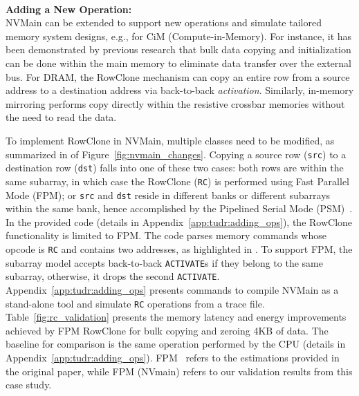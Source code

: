 ~\\\noindent \textbf{Adding a New Operation:}\\
NVMain can be extended to support new operations and simulate tailored memory system designs, e.g., for CiM (Compute-in-Memory). For instance, it has been demonstrated by previous research that bulk data copying and initialization can be done within the main memory to eliminate data transfer over the external bus.
For DRAM, the RowClone \cite{kit/rowclone} mechanism can copy an entire row from a source address to a destination address via back-to-back \emph{activation}. Similarly, in-memory mirroring \cite{rowMirroring} performs copy directly within the resistive crossbar memories without the need to read the data.

To implement RowClone in NVMain, multiple classes need to be modified, as summarized in  of Figure~\ref{fig:nvmain_changes}. 
Copying a source row (\texttt{src}) to a destination row (\texttt{dst}) falls into one of these two cases: both rows are within the same subarray, in which case the RowClone (\texttt{RC}) is performed using Fast Parallel Mode (FPM); or \texttt{src} and \texttt{dst} reside in different banks or different subarrays within the same bank, hence accomplished by the Pipelined Serial Mode (PSM)~\cite{kit/rowclone}. 
In the provided code (details in Appendix~\ref{app:tudr:adding_ops}), the RowClone functionality is limited to FPM. The code parses memory commands whose opcode is \texttt{RC} and contains two addresses, as highlighted in . 
To support FPM, the subarray model accepts back-to-back \texttt{ACTIVATE}s if they belong to the same subarray, otherwise, it drops the second \texttt{ACTIVATE}.
Appendix~\ref{app:tudr:adding_ops} presents commands to compile NVMain as a stand-alone tool and simulate \texttt{RC} operations from a trace file.
Table~\ref{fig:rc_validation} presents the memory latency and energy improvements achieved by FPM RowClone for bulk copying and zeroing 4KB of data. The baseline for comparison is the same operation performed by the CPU (details in Appendix~\ref{app:tudr:adding_ops}). FPM~\cite{ambit} refers to the estimations provided in the original paper, while FPM (NVmain) refers to our validation results from this case study. 

